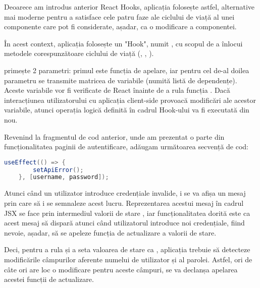 Deoarece am introdus anterior React Hooks, aplicația folosește astfel, alternative mai moderne\cite{.reactmodern} pentru a satisface cele patru faze ale ciclului de viață al unei componente care pot fi considerate, așadar, ca o modificare a componentei.\newline

În acest context, aplicația folosește un "Hook", numit , cu scopul de a înlocui metodele corespunzătoare ciclului de viață (, , ).\newline

 primește 2 parametri: primul este funcția de apelare, iar pentru cel de-al doilea parametru se transmite matricea de variabile (numită listă de dependențe). Aceste variabile vor fi verificate de React înainte de a rula funcția . Dacă interacțiunea utilizatorului cu aplicația client-side provoacă modificări ale acestor variabile, atunci operația logică definită în cadrul Hook-ului  va fi executată din nou.\newline

Revenind la fragmentul de cod anterior, unde am prezentat o parte din funcționalitatea paginii de autentificare, adăugam următoarea secvență de cod:\newline

\begin{lstlisting}[language=Java]
	  useEffect(() => {
		setApiError();
	}, [username, password]);
\end{lstlisting}
\bigskip

Atunci când un utilizator introduce credențiale invalide, i se va afișa un mesaj prin care să i se semnaleze acest lucru. Reprezentarea acestui mesaj în cadrul JSX se face prin intermediul valorii de stare , iar funcționalitatea dorită este ca acest mesaj să dispară atunci când utilizatorul introduce noi credențiale, fiind nevoie, așadar, să se apeleze funcția de actualizare a valorii de stare.\newline

Deci, pentru a rula  și a seta valoarea de stare  ca , aplicația trebuie să detecteze modificările câmpurilor aferente numelui de utilizator și al parolei. Astfel, ori de câte ori are loc o modificare pentru aceste câmpuri, se va declanșa apelarea acestei funcții de actualizare.\newline

